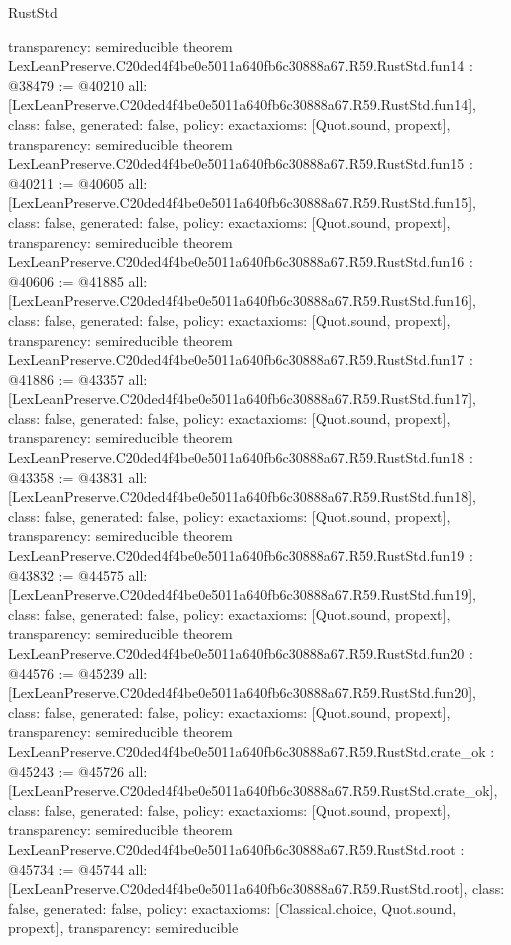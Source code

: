 \begin{lexlean}{RustStd}
\begin{coremodule}
{  transparency: semireducible
}
theorem LexLeanPreserve.C20ded4f4be0e5011a640fb6c30888a67.R59.RustStd.fun14 : @38479 := @40210 {
  all: [LexLeanPreserve.C20ded4f4be0e5011a640fb6c30888a67.R59.RustStd.fun14],
  class: false,
  generated: false,
  policy: exact{axioms: [Quot.sound, propext]},
  transparency: semireducible
}
theorem LexLeanPreserve.C20ded4f4be0e5011a640fb6c30888a67.R59.RustStd.fun15 : @40211 := @40605 {
  all: [LexLeanPreserve.C20ded4f4be0e5011a640fb6c30888a67.R59.RustStd.fun15],
  class: false,
  generated: false,
  policy: exact{axioms: [Quot.sound, propext]},
  transparency: semireducible
}
theorem LexLeanPreserve.C20ded4f4be0e5011a640fb6c30888a67.R59.RustStd.fun16 : @40606 := @41885 {
  all: [LexLeanPreserve.C20ded4f4be0e5011a640fb6c30888a67.R59.RustStd.fun16],
  class: false,
  generated: false,
  policy: exact{axioms: [Quot.sound, propext]},
  transparency: semireducible
}
theorem LexLeanPreserve.C20ded4f4be0e5011a640fb6c30888a67.R59.RustStd.fun17 : @41886 := @43357 {
  all: [LexLeanPreserve.C20ded4f4be0e5011a640fb6c30888a67.R59.RustStd.fun17],
  class: false,
  generated: false,
  policy: exact{axioms: [Quot.sound, propext]},
  transparency: semireducible
}
theorem LexLeanPreserve.C20ded4f4be0e5011a640fb6c30888a67.R59.RustStd.fun18 : @43358 := @43831 {
  all: [LexLeanPreserve.C20ded4f4be0e5011a640fb6c30888a67.R59.RustStd.fun18],
  class: false,
  generated: false,
  policy: exact{axioms: [Quot.sound, propext]},
  transparency: semireducible
}
theorem LexLeanPreserve.C20ded4f4be0e5011a640fb6c30888a67.R59.RustStd.fun19 : @43832 := @44575 {
  all: [LexLeanPreserve.C20ded4f4be0e5011a640fb6c30888a67.R59.RustStd.fun19],
  class: false,
  generated: false,
  policy: exact{axioms: [Quot.sound, propext]},
  transparency: semireducible
}
theorem LexLeanPreserve.C20ded4f4be0e5011a640fb6c30888a67.R59.RustStd.fun20 : @44576 := @45239 {
  all: [LexLeanPreserve.C20ded4f4be0e5011a640fb6c30888a67.R59.RustStd.fun20],
  class: false,
  generated: false,
  policy: exact{axioms: [Quot.sound, propext]},
  transparency: semireducible
}
theorem LexLeanPreserve.C20ded4f4be0e5011a640fb6c30888a67.R59.RustStd.crate_ok : @45243 := @45726 {
  all: [LexLeanPreserve.C20ded4f4be0e5011a640fb6c30888a67.R59.RustStd.crate_ok],
  class: false,
  generated: false,
  policy: exact{axioms: [Quot.sound, propext]},
  transparency: semireducible
}
theorem LexLeanPreserve.C20ded4f4be0e5011a640fb6c30888a67.R59.RustStd.root : @45734 := @45744 {
  all: [LexLeanPreserve.C20ded4f4be0e5011a640fb6c30888a67.R59.RustStd.root],
  class: false,
  generated: false,
  policy: exact{axioms: [Classical.choice, Quot.sound, propext]},
  transparency: semireducible
}


\end{coremodule}
\end{lexlean}

